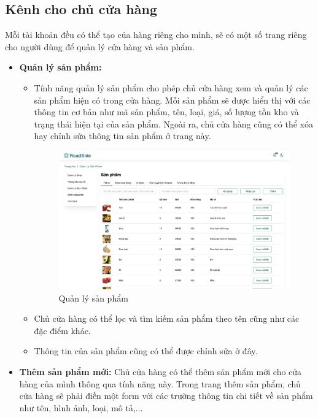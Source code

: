 \subsection{Kênh cho chủ cửa hàng}
Mỗi tài khoản đều có thể tạo của hàng riêng cho mình, sẽ có một số trang riêng cho người dùng để quản lý cửa hàng và sản phẩm.
\begin{itemize}
    \item \textbf{Quản lý sản phẩm:}
    \begin{itemize}
        \item Tính năng quản lý sản phẩm cho phép chủ cửa hàng xem và quản lý các sản phẩm hiện có trong cửa hàng. Mỗi sản phẩm sẽ được hiển thị với các thông tin cơ bản như mã sản phẩm, tên, loại, giá, số lượng tồn kho và trạng thái hiện tại của sản phẩm. Ngoài ra, chủ cửa hàng cũng có thể xóa hay chỉnh sửa thông tin sản phẩm ở trang này.
        \begin{figure}[H]
            \centering
            \includegraphics[width=0.95\linewidth] {Images/UI/shop_products.png}
            \vspace{1em}
            \caption{Quản lý sản phẩm}
        \end{figure}
        \item Chủ cửa hàng có thể lọc và tìm kiếm sản phẩm theo tên cũng như các đặc điểm khác.
        \item Thông tin của sản phẩm cũng có thể được chỉnh sửa ở đây.
    \end{itemize}
    \item \textbf{Thêm sản phẩm mới:} Chủ cửa hàng có thể thêm sản phẩm mới cho cửa hàng của mình thông qua tính năng này. Trong trang thêm sản phẩm, chủ cửa hàng sẽ phải điền một form với các trường thông tin chi tiết về sản phẩm như tên, hình ảnh, loại, mô tả,... 
        \begin{figure}[H]

\end{figure}
\end{itemize}
